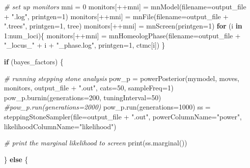 \documentclass[
]{book}
\newenvironment{Shaded}{\begin{snugshade}}{\end{snugshade}}
\newcommand{\AttributeTok}[1]{\textcolor[rgb]{0.77,0.63,0.00}{#1}}
\newcommand{\CommentTok}[1]{\textcolor[rgb]{0.56,0.35,0.01}{\textit{#1}}}
\newcommand{\ControlFlowTok}[1]{\textcolor[rgb]{0.13,0.29,0.53}{\textbf{#1}}}
\newcommand{\DecValTok}[1]{\textcolor[rgb]{0.00,0.00,0.81}{#1}}
\newcommand{\FunctionTok}[1]{\textcolor[rgb]{0.00,0.00,0.00}{#1}}
\newcommand{\NormalTok}[1]{#1}
\newcommand{\OtherTok}[1]{\textcolor[rgb]{0.56,0.35,0.01}{#1}}
\newcommand{\SpecialCharTok}[1]{\textcolor[rgb]{0.00,0.00,0.00}{#1}}
\newcommand{\StringTok}[1]{\textcolor[rgb]{0.31,0.60,0.02}{#1}}
\begin{document}
\begin{Shaded}
\begin{Highlighting}[]
\CommentTok{\# set up monitors}
\NormalTok{mni }\OtherTok{=} \DecValTok{0}
\NormalTok{monitors[}\SpecialCharTok{++}\NormalTok{mni] }\OtherTok{=} \FunctionTok{mnModel}\NormalTok{(}\AttributeTok{filename=}\NormalTok{output\_file }\SpecialCharTok{+} \StringTok{".log"}\NormalTok{, }\AttributeTok{printgen=}\DecValTok{1}\NormalTok{)}
\NormalTok{monitors[}\SpecialCharTok{++}\NormalTok{mni] }\OtherTok{=} \FunctionTok{mnFile}\NormalTok{(}\AttributeTok{filename=}\NormalTok{output\_file }\SpecialCharTok{+} \StringTok{".trees"}\NormalTok{, }\AttributeTok{printgen=}\DecValTok{1}\NormalTok{, tree)}
\NormalTok{monitors[}\SpecialCharTok{++}\NormalTok{mni] }\OtherTok{=} \FunctionTok{mnScreen}\NormalTok{(}\AttributeTok{printgen=}\DecValTok{1}\NormalTok{)}
\ControlFlowTok{for}\NormalTok{ (i }\ControlFlowTok{in} \DecValTok{1}\SpecialCharTok{:}\NormalTok{num\_loci)\{}
\NormalTok{    monitors[}\SpecialCharTok{++}\NormalTok{mni] }\OtherTok{=} \FunctionTok{mnHomeologPhase}\NormalTok{(}\AttributeTok{filename=}\NormalTok{output\_file }\SpecialCharTok{+} \StringTok{"\_locus\_"} \SpecialCharTok{+}\NormalTok{ i }\SpecialCharTok{+} \StringTok{"\_phase.log"}\NormalTok{, }\AttributeTok{printgen=}\DecValTok{1}\NormalTok{, ctmc[i])}
\NormalTok{\}}

\ControlFlowTok{if}\NormalTok{ (bayes\_factors) \{}

    \CommentTok{\# running stepping stone analysis}
\NormalTok{    pow\_p }\OtherTok{=} \FunctionTok{powerPosterior}\NormalTok{(mymodel, moves, monitors, output\_file }\SpecialCharTok{+} \StringTok{".out"}\NormalTok{, }\AttributeTok{cats=}\DecValTok{50}\NormalTok{, }\AttributeTok{sampleFreq=}\DecValTok{1}\NormalTok{) }
    \FunctionTok{pow\_p.burnin}\NormalTok{(}\AttributeTok{generations=}\DecValTok{200}\NormalTok{, }\AttributeTok{tuningInterval=}\DecValTok{50}\NormalTok{)}
    \CommentTok{\#pow\_p.run(generations=2000)  }
    \FunctionTok{pow\_p.run}\NormalTok{(}\AttributeTok{generations=}\DecValTok{1000}\NormalTok{)  }
\NormalTok{    ss }\OtherTok{=} \FunctionTok{steppingStoneSampler}\NormalTok{(}\AttributeTok{file=}\NormalTok{output\_file }\SpecialCharTok{+} \StringTok{".out"}\NormalTok{, }\AttributeTok{powerColumnName=}\StringTok{"power"}\NormalTok{, }\AttributeTok{likelihoodColumnName=}\StringTok{"likelihood"}\NormalTok{)}

    \CommentTok{\# print the marginal likelihood to screen}
    \FunctionTok{print}\NormalTok{(}\FunctionTok{ss.marginal}\NormalTok{())}

\NormalTok{\} }\ControlFlowTok{else}\NormalTok{ \{}


\end{Highlighting}
\end{Shaded}
\end{document}
